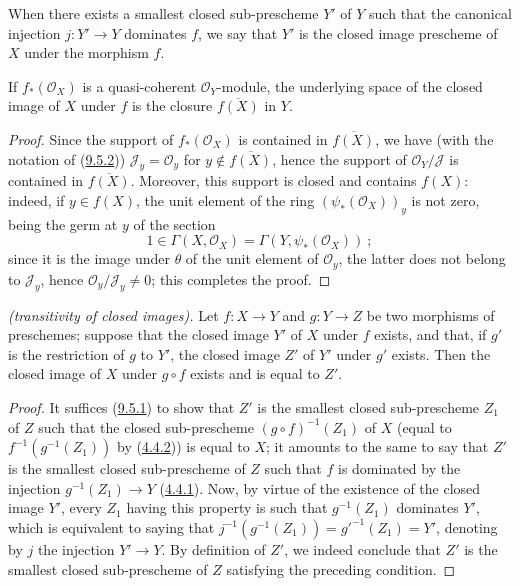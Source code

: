\begin{definition}[9.5.3]
\label{I.9.5.3}
When there exists a smallest closed sub-prescheme $Y'$ of $Y$ such that
the canonical injection $j:Y'\to Y$ dominates $f$, we say that $Y'$ is the
closed image prescheme of $X$ under the morphism $f$.
\end{definition}

\begin{proposition}[9.5.4]
\label{I.9.5.4}
If $f_*(\mathscr{O}_X)$ is a quasi-coherent $\mathscr{O}_Y$-module, the
underlying space of the closed image of $X$ under $f$ is the closure
$\overline{f(X)}$ in $Y$.
\end{proposition}

\begin{proof}
Since the support of $f_*(\mathscr{O}_X)$ is contained in
$\overline{f(X)}$, we have (with the notation of
(\hyperref[I.9.5.2]{9.5.2})) $\mathscr{J}_y=\mathscr{O}_y$ for
$y\notin\overline{f(X)}$, hence the support of
$\mathscr{O}_Y/\mathscr{J}$ is contained in $\overline{f(X)}$. Moreover,
this support is closed and contains $f(X)$: indeed, if $y\in f(X)$, the
unit element of the ring $(\psi_*(\mathscr{O}_X))_y$ is not zero, being the
germ at $y$ of the section
\[
  1\in\Gamma(X,\mathscr{O}_X)=\Gamma(Y,\psi_*(\mathscr{O}_X))~;
\]
since it is the image under $\theta$ of the unit element of $\mathscr{O}_y$,
the latter does not belong to $\mathscr{J}_y$, hence
$\mathscr{O}_y/\mathscr{J}_y\neq0$; this completes the proof.
\end{proof}

\begin{proposition}[9.5.5]
\label{I.9.5.5}
\emph{(transitivity of closed images).} Let $f:X\to Y$ and $g:Y\to Z$
be two morphisms of preschemes; suppose that the closed image $Y'$ of $X$
under $f$ exists, and that, if $g'$ is the restriction of $g$ to $Y'$, the
closed image $Z'$ of $Y'$ under $g'$ exists. Then the closed image of $X$
under $g\circ f$ exists and is equal to $Z'$.
\end{proposition}

\begin{proof}
It suffices (\hyperref[I.9.5.1]{9.5.1}) to show that $Z'$ is the
smallest closed sub-prescheme $Z_1$ of $Z$ such that the closed sub-prescheme
$(g\circ f)^{-1}(Z_1)$ of $X$ (equal to $f^{-1}(g^{-1}(Z_1))$ by
(\hyperref[I.4.4.2]{4.4.2})) is equal to $X$; it amounts to the same to
say that $Z'$ is the smallest closed sub-prescheme of $Z$ such that $f$ is
dominated by the injection $g^{-1}(Z_1)\to Y$
(\hyperref[I.4.4.1]{4.4.1}). Now, by virtue of the existence of the
closed image $Y'$, every $Z_1$ having this property is such that
$g^{-1}(Z_1)$ dominates $Y'$, which is equivalent to saying that
$j^{-1}(g^{-1}(Z_1))=g'^{-1}(Z_1)=Y'$, denoting by $j$ the injection
$Y'\to Y$. By definition of $Z'$, we indeed conclude that $Z'$ is the
smallest closed sub-prescheme of $Z$ satisfying the preceding condition.
\end{proof}

